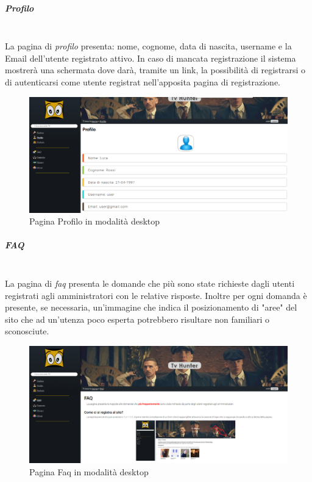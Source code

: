 \subparagraph{Profilo}
~\\
La pagina di \textit{profilo} presenta: nome, cognome, data di nascita, username e la Email dell'utente registrato attivo. In caso di mancata registrazione il sistema mostrerà una schermata dove darà, tramite un link, la possibilità di registrarsi o di autenticarsi come utente registrat nell'apposita pagina di registrazione. 
\begin{figure}[H]
	\centerline{\includegraphics[scale= 0.33]{img/profilo.png}}
	\caption{Pagina Profilo in modalità desktop}
\end{figure}


\subparagraph{FAQ} 
~\\
La pagina di \textit{faq} presenta le domande che più sono state richieste dagli utenti registrati agli amministratori con le relative risposte. Inoltre per ogni domanda è presente, se necessaria, un'immagine che indica il posizionamento di "aree" del sito che ad un'utenza poco esperta potrebbero risultare non familiari o sconosciute.
\begin{figure}[H]
	\centerline{\includegraphics[scale= 0.33]{img/faq.png}}
	\caption{Pagina Faq in modalità desktop}
	
\end{figure}


